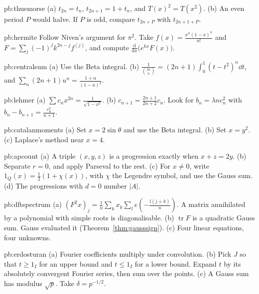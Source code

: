 \begin{hint}{pb:thuemorse}
(a) $t_{2n}=t_n$, $t_{2n+1}=1+t_n$, and $T(x)^2=T(x^2)$. (b) An even period $P$ would halve. If $P$ is odd, compare
$t_{2n+P}$ with $t_{2n+1+P}$.
\end{hint}

\begin{hint}{pb:hermite}
Follow Niven's argument for $\pi^2$. Take $f(x)=\frac{x^n(1-x)^n}{n!}$ and $F=\sum_j(-1)^jk^{2n-j}f^{(j)}$, and compute $\frac{\mathrm d}{\mathrm dx}\bigl(e^{kx}F(x)\bigr)$.
\end{hint}

\begin{hint}{pb:centralsum}
(a) Use the Beta integral. (b) $\frac1{\binom{2n}n}=(2n+1)\int_0^1(t-t^2)^n\dd t$, and $\sum_n(2n+1)u^n=\frac{1+u}{(1-u)^2}$.
\end{hint}

\begin{hint}{pb:lehmer}
(a) $\sum c_nx^{2n}=\frac1{\sqrt{1-x^2}}$. (b) $c_{n+1}=\frac{2n+1}{2n+2}c_n$. Look for $b_n=\lambda nc_n^2$ with $b_n-b_{n+1}=\frac{c_n^2}{n+1}$.
\end{hint}

\begin{hint}{pb:catalanmoments}
(a) Set $x=2\sin\theta$ and use the Beta integral. (b) Set $x=y^2$. (c) Laplace's method near $x=4$.
\end{hint}

\begin{hint}{pb:apcount}
(a) A triple $(x,y,z)$ is a progression exactly when $x+z=2y$. (b) Separate $r=0$, and apply Parseval to the rest. (c) For $x\ne0$, write $1_Q(x)=\frac12(1+\chi(x))$,
with $\chi$ the Legendre symbol, and use the Gauss sum. (d) The progressions with $d=0$ number $|A|$.
\end{hint}

\begin{hint}{pb:dftspectrum}
(a) $(F^2x)_j=\frac1n\sum_kx_k\sum_le(-\frac{l(j+k)}n)$. A matrix annihilated by a polynomial with simple roots is diagonalisable. (b) $\operatorname{tr}F$ is a
quadratic Gauss sum. Gauss evaluated it (Theorem~\ref{thm:gausssign}). (c) Four linear equations, four unknowns.
\end{hint}

\begin{hint}{pb:erdosturan}
(a) Fourier coefficients multiply under convolution. (b) Pick $J$ so that $t\ge1_I$ for an upper bound and $t\le1_I$ for a lower
bound. Expand $t$ by its absolutely convergent Fourier series, then sum over the points. (c) A Gauss sum has modulus $\sqrt p$.
Take $\delta=p^{-1/2}$.
\end{hint}

